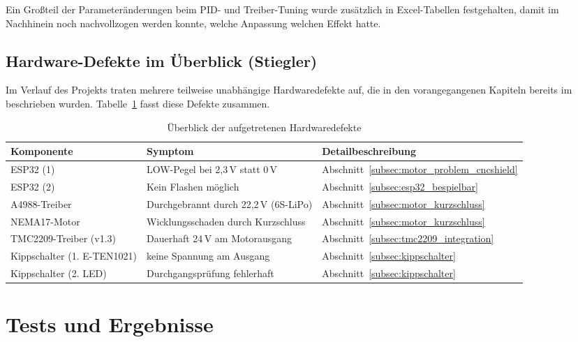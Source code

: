 \documentclass[fontsize=12pt,
parskip=half,	%
department=FakM,  %
logostyle=flat,
twoside, %
DIV=15,BCOR=10mm, %
]{OTHRreprt}
\begin{document}
Ein Großteil der Parameteränderungen beim PID- und Treiber-Tuning wurde zusätzlich in Excel-Tabellen festgehalten, damit im Nachhinein noch nachvollzogen werden konnte, welche Anpassung welchen Effekt hatte.

\section{Hardware-Defekte im Überblick (Stiegler)}
\label{sec:hardware_defekte_ueberblick}

Im Verlauf des Projekts traten mehrere teilweise unabhängige Hardwaredefekte auf, die in den vorangegangenen Kapiteln bereits im beschrieben wurden. Tabelle~\ref{tab:defekte_uebersicht} fasst diese Defekte zusammen.

\begin{table}[h]
    \centering
    \caption{Überblick der aufgetretenen Hardwaredefekte}
    \label{tab:defekte_uebersicht}
    \begin{tabular}{|l|p{5cm}|l|}
        \hline
        \textbf{Komponente} & \textbf{Symptom} & \textbf{Detailbeschreibung} \\
        \hline
        ESP32 (1) & LOW-Pegel bei 2,3\,V statt 0\,V & Abschnitt~\ref{subsec:motor_problem_cncshield} \\
        \hline
        ESP32 (2) & Kein Flashen möglich & Abschnitt~\ref{subsec:esp32_bespielbar} \\
        \hline
        A4988-Treiber & Durchgebrannt durch 22,2\,V (6S-LiPo) & Abschnitt~\ref{subsec:motor_kurzschluss} \\
        \hline
        NEMA17-Motor & Wicklungsschaden durch Kurzschluss & Abschnitt~\ref{subsec:motor_kurzschluss} \\
        \hline
        TMC2209-Treiber (v1.3) & Dauerhaft 24\,V am Motorausgang & Abschnitt~\ref{subsec:tmc2209_integration} \\
        \hline
        Kippschalter (1. E-TEN1021) & keine Spannung am Ausgang & Abschnitt~\ref{subsec:kippschalter} \\
        \hline
        Kippschalter (2. LED) & Durchgangsprüfung fehlerhaft & Abschnitt~\ref{subsec:kippschalter} \\
        \hline
    \end{tabular}
\end{table}

\chapter{Tests und Ergebnisse}
\label{ch:tests}
\end{document}

